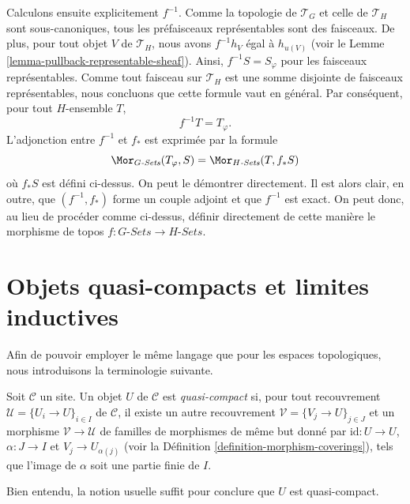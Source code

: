 \medskip\noindent
Calculons ensuite explicitement $f^{-1}$. Comme la topologie
de $\mathcal{T}_G$ et celle de $\mathcal{T}_H$ sont sous-canoniques, tous les
préfaisceaux représentables sont des faisceaux. De plus, pour tout objet $V$
de $\mathcal{T}_H$, nous avons $f^{-1}h_V$ égal à $h_{u(V)}$ (voir le
Lemme \ref{lemma-pullback-representable-sheaf}). Ainsi,
$f^{-1}S = S_\varphi$ pour les faisceaux représentables. Comme tout faisceau sur
$\mathcal{T}_H$ est une somme disjointe de faisceaux représentables, nous concluons que
cette formule vaut en général. Par conséquent, pour tout $H$-ensemble $T$,
$$
f^{-1}T = T_\varphi.
$$
L’adjonction entre $f^{-1}$ et $f_*$ est exprimée par la formule
$$
\Mor_{G\textit{-Sets}}(T_\varphi, S) =
\Mor_{H\textit{-Sets}}(T, f_*S)
$$
où $f_*S$ est défini ci-dessus. On peut le démontrer directement. Il est alors clair,
en outre, que $(f^{-1}, f_*)$ forme un couple adjoint et que $f^{-1}$ est exact.
On peut donc, au lieu de procéder comme ci-dessus, définir directement de cette
manière le morphisme de topos
$f : G\textit{-Sets} \to H\textit{-Sets}$.












\section{Objets quasi-compacts et limites inductives}
\label{section-quasi-compact}

\noindent
Afin de pouvoir employer le même langage que pour les espaces topologiques,
nous introduisons la terminologie suivante.

\begin{definition}
\label{definition-quasi-compact}
Soit $\mathcal{C}$ un site. Un objet $U$ de $\mathcal{C}$ est
{\it quasi-compact} si, pour tout recouvrement $\mathcal{U} = \{U_i \to U\}_{i \in I}$
de $\mathcal{C}$, il existe un autre recouvrement
$\mathcal{V} = \{V_j \to U\}_{j \in J}$ et un morphisme
$\mathcal{V} \to \mathcal{U}$ de familles de morphismes de même but
donné par $\text{id} : U \to U$, $\alpha : J \to I$ et $V_j \to U_{\alpha(j)}$
(voir la Définition \ref{definition-morphism-coverings}),
tels que l’image de $\alpha$ soit une partie finie de $I$.
\end{definition}

\noindent
Bien entendu, la notion usuelle suffit pour conclure que
$U$ est quasi-compact.

